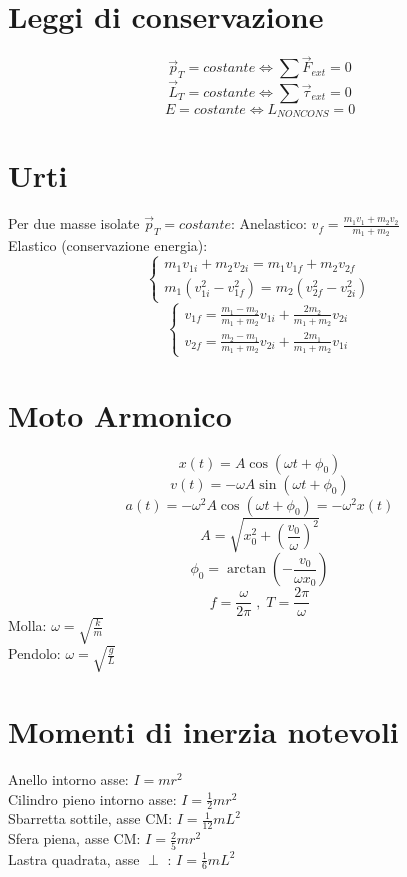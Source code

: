 \documentclass{article}
\begin{document}
\begin{small}
\begin{multicols}{3}
\section{Leggi di conservazione}
		\[ \vec p_T = costante \Leftrightarrow \sum \vec F_{ext} = 0 \]
		\[ \vec L_T = costante \Leftrightarrow \sum \vec \tau_{ext} = 0 \]
		\[ E = costante \Leftrightarrow L_{NON CONS} = 0 \]
\section{Urti}
		Per due masse isolate $ \vec p_T = costante $:
		Anelastico: $ v_f = \frac{ m_1 v_1 + m_2 v_2 }{ m_1 + m_2 } $ \\
		Elastico (conservazione energia):
		\[ \begin{cases} m_1 v_{1i} + m_2 v_{2i} = m_1 v_{1f} + m_2 v_{2f}
		\\ m_1 ( v_{1i}^2 - v_{1f}^2 ) = m_2 ( v_{2f}^2 - v_{2i}^2 ) \end{cases} \]
		\[ \begin{cases} v_{1f} = \frac{ m_1 - m_2 }{ m_1 + m_2 } v_{1i} + \frac{ 2 m_2 }{ m_1 + m_2 } v_{2i}
		\\ v_{2f} = \frac{ m_2 - m_1 }{ m_1 + m_2 } v_{2i} + \frac{ 2 m_1 }{ m_1 + m_2 } v_{1i} \end{cases} \]
\section{Moto Armonico}
		\[ x ( t ) = A \cos ( \omega t + \phi_0 ) \]
		\[ v ( t ) = - \omega A \sin ( \omega t + \phi_0 ) \]
		\[ a ( t ) = - \omega^2 A \cos ( \omega t + \phi_0 ) = - \omega^2 x( t ) \]
		\[ A = \sqrt{ x_0^2 + ( \frac{ v_0 }{ \omega } )^2 } \]
		\[ \phi_0 = \arctan ( - \frac{ v_0 }{ \omega x_0 } ) \]
		\[ f = \frac{ \omega }{ 2 \pi } \;,\; T = \frac{ 2 \pi }{ \omega } \]
		Molla: $ \omega = \sqrt{ \frac{ k }{ m } } $ \\
		Pendolo: $ \omega = \sqrt{ \frac{ g }{ L } } $
\section{Momenti di inerzia notevoli}
		Anello intorno asse: $ I = m r^2 $ \\
		Cilindro pieno intorno asse: $ I = \frac{1}{2} m r^2 $ \\
		Sbarretta sottile, asse CM: $ I = \frac{1}{ 12 } m L^2 $ \\
		Sfera piena, asse CM: $ I = \frac{ 2 }{ 5 } m r^2 $ \\
		Lastra quadrata, asse $\perp$ : $ I = \frac{1}{ 6 } m L^2 $

\end{multicols}
\end{small}
\end{document}
